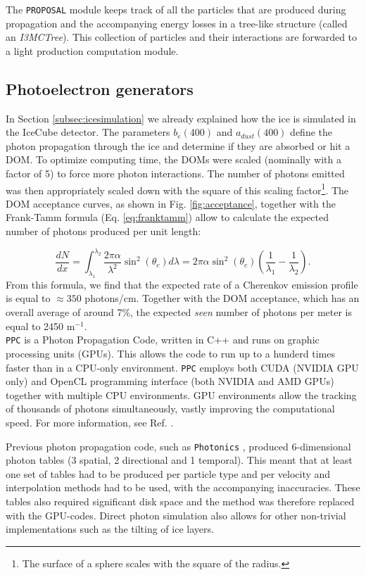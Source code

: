 \noindent The \texttt{PROPOSAL} module keeps track of all the particles that are produced during propagation and the accompanying energy losses in a tree-like structure (called an \textit{I3MCTree}). This collection of particles and their interactions are forwarded to a light production computation module.

\subsection{Photoelectron generators}
In Section \ref{subsec:icesimulation} we already explained how the ice is simulated in the IceCube detector. The parameters $b_e(400)$ and $a_{dust}(400)$ define the photon propagation through the ice and determine if they are absorbed or hit a DOM. To optimize computing time, the DOMs were scaled (nominally with a factor of 5) to force more photon interactions. The number of photons emitted was then appropriately scaled down with the square of this scaling factor\footnote{The surface of a sphere scales with the square of the radius.}. The DOM acceptance curves, as shown in Fig. \ref{fig:acceptance}, together with the Frank-Tamm formula (Eq. \ref{eq:franktamm}) allow to calculate the expected number of photons produced per unit length:

\begin{equation}
\frac{dN}{dx} = \int_{\lambda_1}^{\lambda_2} \frac{2 \pi \alpha}{\lambda^2} \sin^2 \left(\theta_c\right) d\lambda = 2\pi \alpha \sin^2 \left(\theta_c\right) \left(\frac{1}{\lambda_1} -\frac{1}{\lambda_2}\right).
\end{equation}
From this formula, we find that the expected rate of a Cherenkov emission profile is equal to $\approx 350$ photons/cm. Together with the DOM acceptance, which has an overall average of around 7\%, the expected \textit{seen} number of photons per meter is equal to 2450 m$^{-1}$.\\

\noindent \texttt{PPC} is a Photon Propagation Code, written in C++ and runs on graphic processing units (GPUs). This allows the code to run up to a hunderd times faster than in a CPU-only environment. \texttt{PPC} employs both CUDA (NVIDIA GPU only) and OpenCL programming interface (both NVIDIA and AMD GPUs) together with multiple CPU environments.
GPU environments allow the tracking of thousands of photons simultaneously, vastly improving the computational speed. For more information, see Ref. \cite{dimaspice}.

Previous photon propagation code, such as \texttt{Photonics}  \cite{Lundberg:2007mf}, produced 6-dimensional photon tables (3 spatial, 2 directional and 1 temporal). This meant that at least one set of tables had to be produced per particle type and per velocity and interpolation methods had to be used, with the accompanying inaccuracies. These tables also required significant disk space and the method was therefore replaced with the GPU-codes. Direct photon simulation also allows for other non-trivial implementations such as the tilting of ice layers.\\

